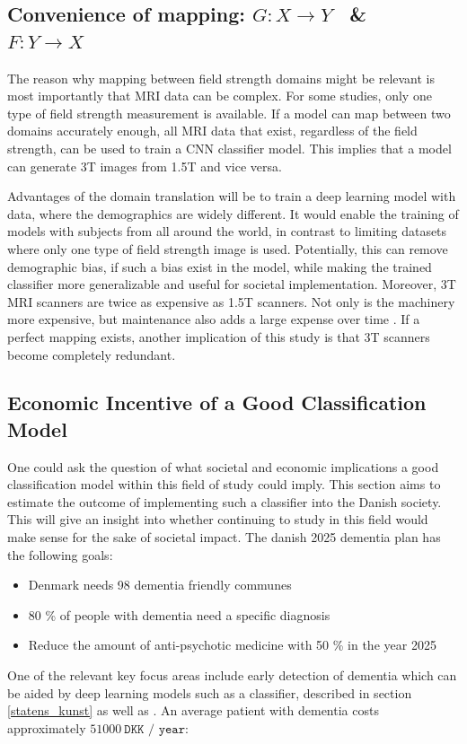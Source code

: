 \documentclass[11pt, fleqn, titlepage]{article}
\newcommand{\1}[1]{\mathds{1}\left[#1\right]}
\begin{document}
\subsection{Convenience of mapping: $ G: X \rightarrow Y $ \ \& \ $ F: Y \rightarrow X $ }

The reason why mapping between field strength domains might be relevant is most importantly that MRI data can be complex. For some studies, only one type of field strength measurement is available. If a model can map between two domains accurately enough, all MRI data that exist, regardless of the field strength, can be used to train a CNN classifier model. This implies that a model can generate 3T images from 1.5T and vice versa. 

Advantages of the domain translation will be to train a deep learning model with data, where the demographics are widely different. It would enable the training of models with subjects from all around the world, in contrast to limiting datasets where only one type of field strength image is used. Potentially, this can remove demographic bias, if such a bias exist in the model, while making the trained classifier more generalizable and useful for societal implementation. Moreover, 3T MRI scanners are twice as expensive as 1.5T scanners. Not only is the machinery more expensive, but maintenance also adds a large expense over time \cite{kmg}. If a perfect mapping exists, another implication of this study is that 3T scanners become completely redundant.

\subsection{Economic Incentive of a Good Classification Model}\label{discussion_economic}

One could ask the question of what societal and economic implications a good classification model within this field of study could imply. This section aims to estimate the outcome of implementing such a classifier into the Danish society. This will give an insight into whether continuing to study in this field would make sense for the sake of societal impact. The danish 2025 dementia plan has the following goals:

\begin{itemize}
	\item Denmark needs 98 dementia friendly communes
	\item 80 \% of people with dementia need a specific diagnosis 
	\item Reduce the amount of anti-psychotic medicine with 50 \% in the year 2025
\end{itemize}
\noindent
One of the relevant key focus areas include early detection of dementia which can be aided by deep learning models such as a classifier, described in section \ref{statens_kunst} as well as \cite{yudong, suk_and_shen_1, suk_and_shen_2, cheng, neuro}. An average patient with dementia costs approximately $ 51000 \ \texttt{DKK / year}$:
\end{document}
